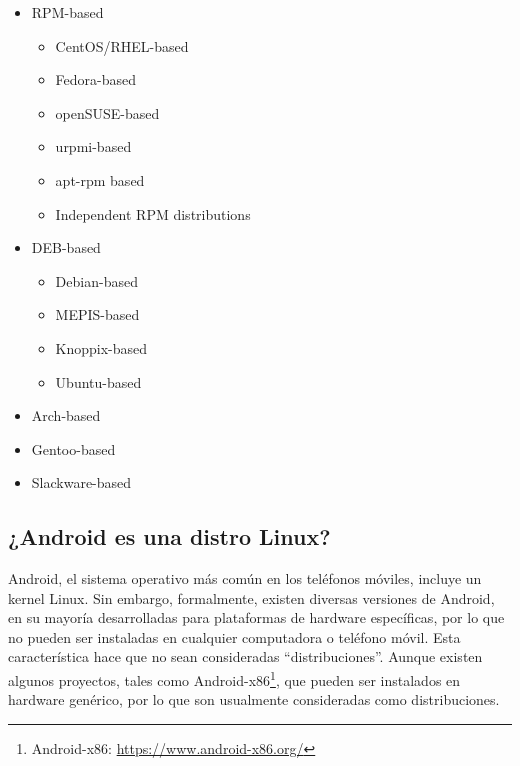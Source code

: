 \begin{itemize}
\item RPM-based
  \begin{itemize}
  \item CentOS/RHEL-based
  \item  Fedora-based
  \item  openSUSE-based
  \item  urpmi-based
  \item  apt-rpm based
  \item  Independent RPM distributions
  \end{itemize}
\item DEB-based
  \begin{itemize}
  \item Debian-based
  \item MEPIS-based
  \item  Knoppix-based
  \item  Ubuntu-based
  \end{itemize}
\item Arch-based
\item Gentoo-based
\item Slackware-based
\end{itemize}


\subsection{¿Android es una distro Linux?}

Android, el sistema operativo más común en los teléfonos móviles, incluye un kernel Linux. Sin embargo, formalmente, existen diversas versiones de Android, en su mayoría desarrolladas para plataformas de hardware específicas, por lo que no pueden ser instaladas en cualquier computadora o teléfono móvil. Esta característica hace que no sean consideradas ``distribuciones''. Aunque existen algunos proyectos, tales como Android-x86\footnote{Android-x86: \url{https://www.android-x86.org/}}, que pueden ser instalados en hardware genérico, por lo que son usualmente consideradas como distribuciones.


